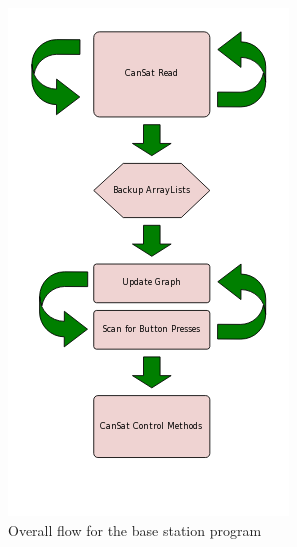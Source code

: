 \documentclass[]{report}
\begin{document}
		\begin{figure}[h]
			\hfill\includegraphics[scale=0.7]{Base-Station-program-flow.png}\hspace*{\fill}
			\caption{Overall flow for the base station program}
			\label{bflow}
		\end{figure}
	
\end{document}
